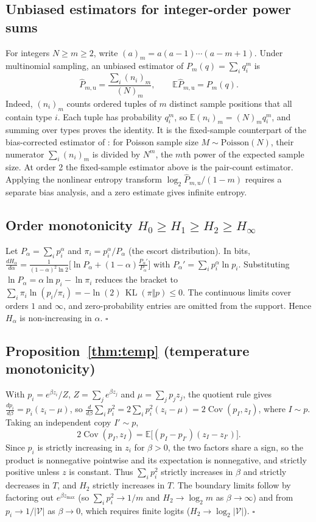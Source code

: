 \documentclass[10pt]{article}
\theoremstyle{plain}
\theoremstyle{definition}
\newcommand{\V}{\mathcal{V}}
\newcommand{\E}{\mathbb{E}}
\newcommand{\Cov}{\operatorname{Cov}}
\newcommand{\KL}{\operatorname{KL}}
\newcommand{\Htwo}{H_2}
\begin{document}
\subsection{Unbiased estimators for integer-order power sums}
\label{app:factorial-estimator}
For integers $N\ge m\ge2$, write $(a)_m=a(a-1)\cdots(a-m+1)$. Under multinomial sampling, an
unbiased estimator of $P_m(q)=\sum_i q_i^m$ is
\[
\widehat P_{m,\mathrm u}=\frac{\sum_i(n_i)_m}{(N)_m},
\qquad \E\widehat P_{m,\mathrm u}=P_m(q).
\]
Indeed, $(n_i)_m$ counts ordered tuples of $m$ distinct sample positions that all contain type
$i$. Each tuple has probability $q_i^m$, so $\E(n_i)_m=(N)_m q_i^m$, and summing over types
proves the identity. It is the fixed-sample counterpart of the bias-corrected estimator of
\citet{acharya2017renyi}: for Poisson sample size $M\sim\mathrm{Poisson}(N)$, their numerator
$\sum_i(n_i)_m$ is divided by $N^m$, the $m$th power of the expected sample size. At order 2
the fixed-sample estimator above is the pair-count estimator. Applying the nonlinear entropy transform
$\log_2\widehat P_{m,\mathrm u}/(1-m)$ requires a separate bias analysis, and a zero estimate
gives infinite entropy.

\subsection{Order monotonicity \texorpdfstring{$H_0\ge H_1\ge \Htwo\ge H_\infty$}{H0 >= H1 >= H2 >= H infinity}}
Let $P_\alpha=\sum_i p_i^\alpha$ and $\pi_i=p_i^\alpha/P_\alpha$ (the escort distribution). In
bits,
$\frac{d H_\alpha}{d\alpha}=\frac{1}{(1-\alpha)^2\ln2}\big[\ln P_\alpha+(1-\alpha)\tfrac{P_\alpha'}{P_\alpha}\big]$
with $P_\alpha'=\sum_i p_i^\alpha\ln p_i$. Substituting $\ln P_\alpha=\alpha\ln p_i-\ln\pi_i$
reduces the bracket to $\sum_i\pi_i\ln(p_i/\pi_i)=-\ln(2)\,\KL(\pi\Vert p)\le0$. The continuous limits
cover orders $1$ and $\infty$, and zero-probability entries are omitted from the support. Hence
$H_\alpha$ is non-increasing in $\alpha$. $\square$

\subsection{Proposition~\ref{thm:temp} (temperature monotonicity)}
With $p_i=e^{\beta z_i}/Z$, $Z=\sum_j e^{\beta z_j}$ and $\mu=\sum_j p_j z_j$, the quotient rule gives $\frac{dp_i}{d\beta}=p_i(z_i-\mu)$, so
$\frac{d}{d\beta}\sum_i p_i^2=2\sum_i p_i^2(z_i-\mu)=2\Cov(p_I,z_I)$, where $I\sim p$. Taking an independent copy $I'\sim p$,
\[
2\Cov(p_I,z_I)=\E\big[(p_I-p_{I'})(z_I-z_{I'})\big].
\]
Since $p_i$ is strictly increasing in $z_i$ for $\beta>0$, the two factors share a sign, so the product is nonnegative pointwise and its expectation is nonnegative, and strictly positive unless $z$ is constant. Thus $\sum_i p_i^2$ strictly increases in $\beta$ and strictly decreases in $T$, and $\Htwo$ strictly increases in $T$. The boundary limits follow by factoring out $e^{\beta z_{\max}}$ (so $\sum_i p_i^2\to1/m$ and $\Htwo\to\log_2 m$ as $\beta\to\infty$) and from $p_i\to1/|\V|$ as $\beta\to0$, which requires finite logits ($\Htwo\to\log_2|\V|$). $\square$
\end{document}
